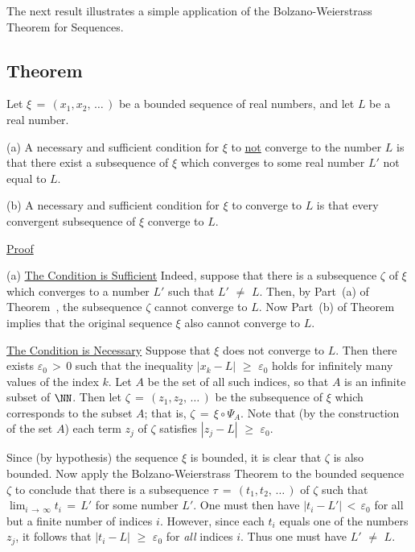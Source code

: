 {\V
\V

        The next result illustrates a simple application of the Bolzano-Weierstrass Theorem for Sequences.


            \subsection{\small{\bf Theorem}}
            \label{ThmC30.20}

        Let ${\xi} \,=\, (x_{1},x_{2},\,{\ldots}\,)$ be a bounded sequence of real numbers, and let $L$ be a real number.

        (a) A necessary and sufficient condition for ${\xi}$ to \underline{not} converge to the number $L$ is that there exist a subsequence of ${\xi}$ which converges to some real number $L'$ not equal to $L$.

\V

        (b) A necessary and sufficient condition for ${\xi}$ to converge to $L$ is that every convergent subsequence of ${\xi}$ converge to $L$.

\V

        \underline{Proof}

        (a) \underline{The Condition is Sufficient} Indeed, suppose that there is a subsequence ${\zeta}$ of ${\xi}$ which converges to a number $L'$ such that $L'\,\,{\neq}\,\, L$.
    Then, by Part~(a) of Theorem~, the subsequence ${\zeta}$ cannot converge to $L$.
    Now Part~(b) of Theorem~ implies that the original sequence ${\xi}$ also cannot converge to $L$.

        \underline{The Condition is Necessary} Suppose that ${\xi}$ does not converge to $L$.
    Then there exists ${\varepsilon}_{0}\,>\,0$ such that the inequality $|x_{k}-L|\,\,{\geq}\,\,{\varepsilon}_{0}$ holds for infinitely many values of the index $k$.
    Let $A$ be the set of all such indices, so that $A$ is an infinite subset of ${\NN}$.
    Then let ${\zeta} \,=\,(z_{1},z_{2},\,{\ldots}\,)$ be the subsequence of ${\xi}$ which corresponds to the subset $A$;
    that is, ${\zeta} \,=\, {\xi}{\circ}{\Psi}_{A}$.
    Note that (by the construction of the set $A$) each term $z_{j}$ of ${\zeta}$ satisfies $|z_{j}-L|\,\,{\geq}\,\,{\varepsilon}_{0}$.

        Since (by hypothesis) the sequence ${\xi}$ is bounded, it is clear that ${\zeta}$ is also bounded.
    Now apply the Bolzano-Weierstrass Theorem to the bounded sequence ${\zeta}$ to conclude that there is a subsequence ${\tau} \,=\, (t_{1},t_{2},\,{\ldots}\,)$ of ${\zeta}$ such that $\lim_{i \,{\rightarrow}\, {\infty}} t_{i} \,=\, L'$ for some number $L'$.
     One must then have  $|t_{i}-L'|\,<\,{\varepsilon}_{0}$ for all but a finite number of indices $i$.
    However, since each $t_{i}$ equals one of the numbers $z_{j}$, it follows that $|t_{i}-L|\,\,{\geq}\,\,{\varepsilon}_{0}$ for {\em all} indices $i$.
    Thus one must have $L' \,\,{\neq}\,\, L$.

}
